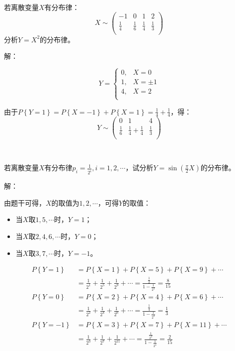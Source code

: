 ~

\begin{example}
若离散变量$X$有分布律：
\[
X\sim \left( \begin{matrix}
	-1&		0&		1&		2\\
	\frac{1}{4}&		\frac{1}{6}&		\frac{1}{4}&		\frac{1}{3}\\
\end{matrix} \right)
\]
分析$Y=X^2$的分布律。
\end{example}

解：

\[
Y=\begin{cases}
	0,&		X=0\\
	1,&		X=\pm 1\\
	4,&		X=2\\
\end{cases}
\]

由于$P\left\{ Y=1 \right\} =P\left\{ X=-1 \right\} +P\left\{ X=1 \right\} =\frac{1}{4}+\frac{1}{4}$，得：
\[
Y\sim \left( \begin{matrix}
	0&		1&		4\\
	\frac{1}{6}&		\frac{1}{4}+\frac{1}{4}&		\frac{1}{3}\\
\end{matrix} \right)
\]

~

\begin{example}
若离散变量$X$有分布律$p_i=\frac{1}{2^i},i=1,2,\cdots $，试分析$Y=\sin \left( \frac{\pi}{2}X \right) $的分布律。
\end{example}

解：

由题干可得，$X$的取值为$1,2,\cdots $，可得$Y$的取值：
\begin{itemize}
    \item 当$X$取$1,5,\cdots $时，$Y=1$；
    \item 当$X$取$2,4,6,\cdots $时，$Y=0$；
    \item 当$X$取$3,7,\cdots $时，$Y=-1$。
\end{itemize}
\begin{align*}
P\left\{ Y=1 \right\} &=P\left\{ X=1 \right\} +P\left\{ X=5 \right\} +P\left\{ X=9 \right\} +\cdots \\
&=\frac{1}{2^1}+\frac{1}{2^5}+\frac{1}{2^9}+\cdots =\frac{\frac{1}{2}}{1-\frac{1}{2^4}}=\frac{8}{15} \\
P\left\{ Y=0 \right\} &=P\left\{ X=2 \right\} +P\left\{ X=4 \right\} +P\left\{ X=6 \right\} +\cdots \\
&=\frac{1}{2^2}+\frac{1}{2^4}+\frac{1}{2^6}+\cdots =\frac{\frac{1}{4}}{1-\frac{1}{2^2}}=\frac{1}{3} \\
P\left\{ Y=-1 \right\} &=P\left\{ X=3 \right\} +P\left\{ X=7 \right\} +P\left\{ X=11 \right\} +\cdots \\
&=\frac{1}{2^3}+\frac{1}{2^7}+\frac{1}{2^{11}}+\cdots =\frac{\frac{1}{2^3}}{1-\frac{1}{2^4}}=\frac{2}{15}
\end{align*}




